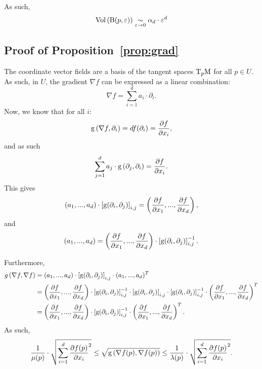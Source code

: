 As such,
$$\mathrm{Vol}\left({\mathrm {B}}(p,\varepsilon)\right)\underset{\varepsilon\rightarrow 0}{\sim} \alpha_d\cdot\varepsilon^d$$

\subsection{Proof of Proposition~\ref{prop:grad}}
The coordinate vector fields are a basis of the tangent spaces $\mathrm{T}_p\mathrm{M}$ for all $p\in U$. As such, in $U$, the gradient $\nabla f$ can be expressed as a linear combination:
$$\nabla f=\sum_{i=1}^d a_i\cdot\partial_i.$$
Now, we know that for all $i$:
$$\mathrm{g}\left(\nabla f,\partial_i\right)=df(\partial_i)=\frac{\partial f}{\partial x_i},$$
and as such
$$\sum_{j=1}^d a_j\cdot \mathrm{g}\left(\partial_j,\partial_i\right)=\frac{\partial f}{\partial x_i}.$$
This gives
$$(a_1,...,a_d)\cdot\left[\mathrm{g}(\partial_i,\partial_j)\right]_{i,j}=\left(\frac{\partial f}{\partial x_1},...,\frac{\partial f}{\partial x_d}\right),$$
and
$$(a_1,...,a_d)=\left(\frac{\partial f}{\partial x_1},...,\frac{\partial f}{\partial x_d}\right)\cdot\left[\mathrm{g}(\partial_i,\partial_j)\right]_{i,j}^{-1}.$$

Furthermore,
\begin{align*}
g\left(\nabla f,\nabla f\right)&=(a_1,...,a_d)\cdot\left[\mathrm{g}(\partial_i,\partial_j)\right]_{i,j}\cdot(a_1,...,a_d)^T\\
&=\left(\frac{\partial f}{\partial x_1},...,\frac{\partial f}{\partial x_d}\right)\cdot\left[\mathrm{g}(\partial_i,\partial_j)\right]_{i,j}^{-1}\cdot\left[\mathrm{g}(\partial_i,\partial_j)\right]_{i,j}\cdot \left[\mathrm{g}(\partial_i,\partial_j)\right]_{i,j}^{-1}\cdot \left(\frac{\partial f}{\partial x_1},...,\frac{\partial f}{\partial x_d}\right)^T\\
&=\left(\frac{\partial f}{\partial x_1},...,\frac{\partial f}{\partial x_d}\right)\cdot \left[\mathrm{g}(\partial_i,\partial_j)\right]_{i,j}^{-1}\cdot \left(\frac{\partial f}{\partial x_1},...,\frac{\partial f}{\partial x_d}\right)^T.
\end{align*}
As such,
$$\frac{1}{\mu(p)}\cdot \sqrt{\sum_{i=1}^d\frac{\partial f(p)}{\partial x_i}^2}\leq \sqrt{\mathrm{g}\left(\nabla f(p),\nabla f(p)\right)}\leq \frac{1}{\lambda(p)}\cdot \sqrt{\sum_{i=1}^d\frac{\partial f(p)}{\partial x_i}^2}.$$




